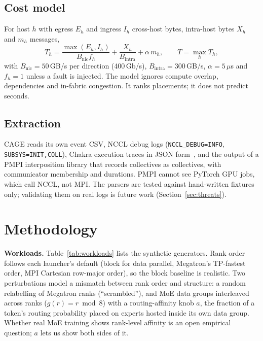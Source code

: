 \documentclass[conference]{IEEEtran}
\begin{document}
\subsection{Cost model}
For host $h$ with egress $E_h$ and ingress $I_h$ cross-host bytes, intra-host bytes $X_h$ and
$m_h$ messages,
\begin{equation}
T_h = \frac{\max(E_h,I_h)}{B_{\mathrm{nic}}f_h} + \frac{X_h}{B_{\mathrm{intra}}} + \alpha\, m_h,
\qquad T = \max_h T_h,
\end{equation}
with $B_{\mathrm{nic}}=50$\,GB/s per direction (400\,Gb/s), $B_{\mathrm{intra}}=300$\,GB/s,
$\alpha=5\,\mu$s and $f_h=1$ unless a fault is injected. The model ignores compute overlap,
dependencies and in-fabric congestion. It ranks placements; it does not predict seconds.

\subsection{Extraction}
CAGE reads its own event CSV, NCCL debug logs (\texttt{NCCL\_DEBUG=INFO},
\texttt{SUBSYS=INIT,COLL}), Chakra execution traces in JSON form~\cite{sridharan2023chakra}, and the
output of a PMPI interposition library that records collectives as collectives, with communicator
membership and durations. PMPI cannot see PyTorch GPU jobs, which call NCCL, not MPI. The parsers
are tested against hand-written fixtures only; validating them on real logs is future work
(Section~\ref{sec:threats}).

\section{Methodology}\label{sec:method}

\textbf{Workloads.} Table~\ref{tab:workloads} lists the synthetic generators. Rank order follows
each launcher's default (block for data parallel, Megatron's TP-fastest order, MPI Cartesian
row-major order), so the block baseline is realistic. Two perturbations model a mismatch between
rank order and structure: a random relabelling of Megatron ranks (``scrambled''), and MoE data
groups interleaved across ranks ($g(r) = r \bmod 8$) with a routing-affinity knob $a$, the fraction
of a token's routing probability placed on experts hosted inside its own data group. Whether real
MoE training shows rank-level affinity is an open empirical question; $a$ lets us show both sides
of it.
\end{document}
